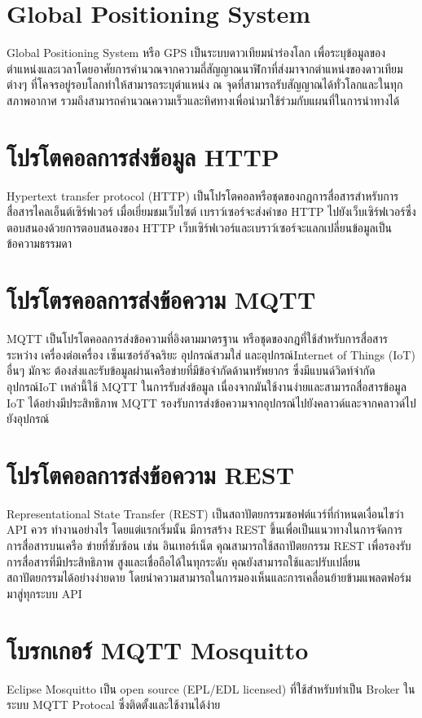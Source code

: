 \section{Global Positioning System}
  Global Positioning System หรือ GPS เป็นระบบดาวเทียมนำร่องโลก เพื่อระบุข้อมูลของตำแหน่งและเวลาโดยอาศัยการคำนวณจากความถี่สัญญาณนาฬิกาที่ส่งมาจากตำแหน่งของดาวเทียมต่างๆ ที่โคจรอยู่รอบโลกทำให้สามารถระบุตำแหน่ง ณ จุดที่สามารถรับสัญญาณได้ทั่วโลกและในทุกสภาพอากาศ รวมถึงสามารถคำนวณความเร็วและทิศทางเพื่อนำมาใช้ร่วมกับแผนที่ในการนำทางได้

\section{โปรโตคอลการส่งข้อมูล HTTP}
  \cite[โปรโตคอลการส่งข้อมูล HTTP]{http} Hypertext transfer protocol (HTTP) เป็นโปรโตคอลหรือชุดของกฎการสื่อสารสำหรับการสื่อสารไคลเอ็นต์เซิร์ฟเวอร์ เมื่อเยี่ยมชมเว็บไซต์ เบราว์เซอร์จะส่งคำขอ HTTP ไปยังเว็บเซิร์ฟเวอร์ซึ่งตอบสนองด้วยการตอบสนองของ HTTP เว็บเซิร์ฟเวอร์และเบราว์เซอร์จะแลกเปลี่ยนข้อมูลเป็นข้อความธรรมดา

\section{โปรโตรคอลการส่งข้อความ MQTT}
  MQTT เป็นโปรโตคอลการส่งข้อความที่อิงตามมาตรฐาน หรือชุดของกฎที่ใช้สําหรับการสื่อสารระหว่าง เครื่องต่อเครื่อง เซ็นเซอร์อัจฉริยะ อุปกรณ์สวมใส่ และอุปกรณ์Internet of Things (IoT) อื่นๆ มักจะ ต้องส่งและรับข้อมูลผ่านเครือข่ายที่มีข้อจํากัดด้านทรัพยากร ซึ่งมีแบนด์วิดท์จํากัด อุปกรณ์IoT เหล่านี้ใช้ MQTT ในการรับส่งข้อมูล เนื่องจากมันใช้งานง่ายและสามารถสื่อสารข้อมูล IoT ได้อย่างมีประสิทธิภาพ MQTT รองรับการส่งข้อความจากอุปกรณ์ไปยังคลาวด์และจากคลาวด์ไปยังอุปกรณ์

\section{โปรโตคอลการส่งข้อความ REST}
  Representational State Transfer (REST) เป็นสถาปัตยกรรมซอฟต์แวร์ที่กําหนดเงื่อนไขว่า API ควร ทํางานอย่างไร โดยแต่แรกเริ่มนั้น มีการสร้าง REST ขึ้นเพื่อเป็นแนวทางในการจัดการการสื่อสารบนเครือ ข่ายที่ซับซ้อน เช่น อินเทอร์เน็ต คุณสามารถใช้สถาปัตยกรรม REST เพื่อรองรับการสื่อสารที่มีประสิทธิภาพ สูงและเชื่อถือได้ในทุกระดับ คุณยังสามารถใช้และปรับเปลี่ยนสถาปัตยกรรมได้อย่างง่ายดาย โดยนําความสามารถในการมองเห็นและการเคลื่อนย้ายข้ามแพลตฟอร์มมาสู่ทุกระบบ API

\section{โบรกเกอร์ MQTT Mosquitto}
\cite[โบรกเกอร์ MQTT Mosquitto]{mosquitto} Eclipse Mosquitto เป็น open source (EPL/EDL licensed) ที่ใช้สำหรับทำเป็น Broker ในระบบ MQTT Protocal ซึ่งติดตั้งและใช้งานได้ง่าย

